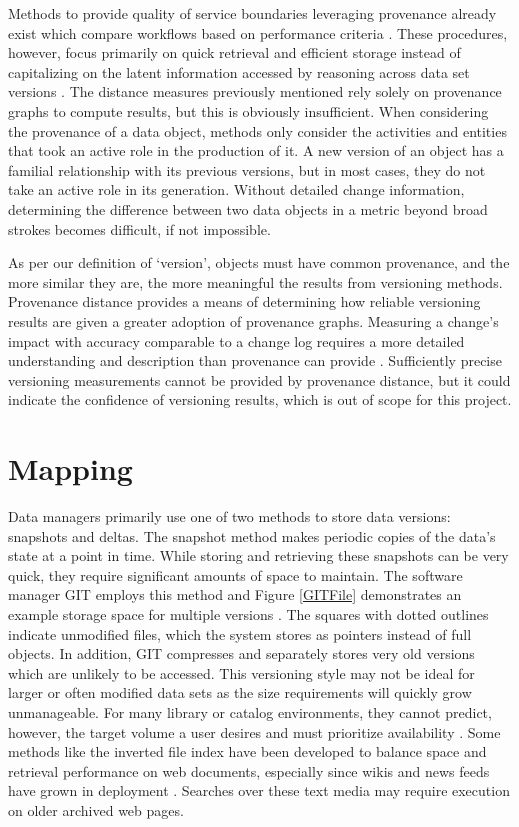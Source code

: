 Methods to provide quality of service boundaries leveraging provenance already exist which compare workflows based on performance criteria \cite{2015:CAA:2778374.2778504}.
These procedures, however, focus primarily on quick retrieval and efficient storage instead of capitalizing on the latent information accessed by reasoning across data set versions \cite{tan2004research}.
The distance measures previously mentioned rely solely on provenance graphs to compute results, but this is obviously insufficient.
When considering the provenance of a data object, methods only consider the activities and entities that took an active role in the production of it.
A new version of an object has a familial relationship with its previous versions, but in most cases, they do not take an active role in its generation.
Without detailed change information, determining the difference between two data objects in a metric beyond broad strokes becomes difficult, if not impossible.

As per our definition of `version', objects must have common provenance, and the more similar they are, the more meaningful the results from versioning methods.
Provenance distance provides a means of determining how reliable versioning results are given a greater adoption of provenance graphs.
Measuring a change's impact with accuracy comparable to a change log requires a more detailed understanding and description than provenance can provide  \cite{Bose:2005:LRS:1057977.1057978}.
Sufficiently precise versioning measurements cannot be provided by provenance distance, but it could indicate the confidence of versioning results, which is out of scope for this project.

\section{Mapping}

Data managers primarily use one of two methods to store data versions: snapshots and deltas.
The snapshot method makes periodic copies of the data's state at a point in time.
While storing and retrieving these snapshots can be very quick, they require significant amounts of space to maintain.
The software manager GIT employs this method and Figure \ref{GITFile} demonstrates an example storage space for multiple versions \cite{Chacon:2009:PG:1618548}.
The squares with dotted outlines indicate unmodified files, which the system stores as pointers instead of full objects.
In addition, GIT compresses and separately stores very old versions which are unlikely to be accessed.
This versioning style may not be ideal for larger or often modified data sets as the size requirements will quickly grow unmanageable.
For many library or catalog environments, they cannot predict, however, the target volume a user desires and must prioritize availability \cite{Payette2002} \cite{Barkstrom_digitallibrary}.
Some methods like the inverted file index have been developed to balance space and retrieval performance on web documents, especially since wikis and news feeds have grown in deployment \cite{Berberich:2007:TMT:1277741.1277831}.
Searches over these text media may require execution on older archived web pages.

